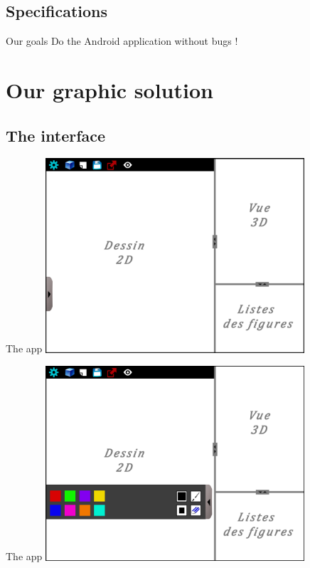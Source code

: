 \documentclass[a4paper,10pt]{beamer}
\begin{document}
		\subsection{Specifications}
		
			\begin{frame}{Our goals}
				Do the Android application without bugs !
			\end{frame}
	
	\section{Our graphic solution}
		
		\subsection{The interface}
		
			\begin{frame}{The app}
				\includegraphics[height=205pt]{images/AppliMenuFerme.png}
			\end{frame}
			
			\begin{frame}{The app}
				\includegraphics[height=205pt]{images/AppliMenuOuvert.png}
			\end{frame}
			
\end{document}
